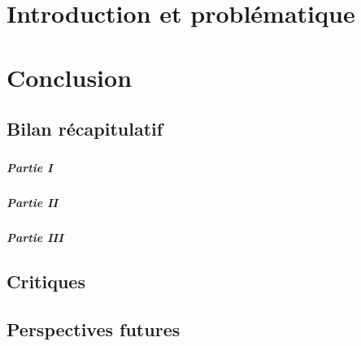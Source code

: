 \documentclass[12pt]{report}
\begin{document}
 
\tableofcontents

\newpage


\chapter{Introduction et problématique}




\newpage

\newpage

\newpage

\chapter{Conclusion}
	\paragraph{}
	\section{Bilan récapitulatif}
		\paragraph{}
		\paragraph{Partie I}
		\paragraph{Partie II}
		\paragraph{Partie III}
	\section{Critiques}
		\paragraph{}
	\section{Perspectives futures}
		\paragraph{}
%


\end{document}
